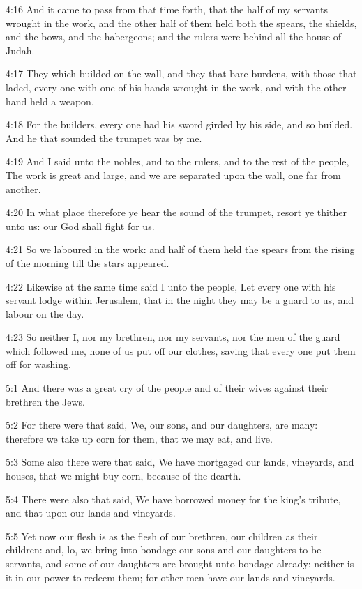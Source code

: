 4:16 And it came to pass from that time forth, that the half of my servants wrought in the work, and the other half of them held both the spears, the shields, and the bows, and the habergeons; and the rulers were behind all the house of Judah.

4:17 They which builded on the wall, and they that bare burdens, with those that laded, every one with one of his hands wrought in the work, and with the other hand held a weapon.

4:18 For the builders, every one had his sword girded by his side, and so builded. And he that sounded the trumpet was by me.

4:19 And I said unto the nobles, and to the rulers, and to the rest of the people, The work is great and large, and we are separated upon the wall, one far from another.

4:20 In what place therefore ye hear the sound of the trumpet, resort ye thither unto us: our God shall fight for us.

4:21 So we laboured in the work: and half of them held the spears from the rising of the morning till the stars appeared.

4:22 Likewise at the same time said I unto the people, Let every one with his servant lodge within Jerusalem, that in the night they may be a guard to us, and labour on the day.

4:23 So neither I, nor my brethren, nor my servants, nor the men of the guard which followed me, none of us put off our clothes, saving that every one put them off for washing.

5:1 And there was a great cry of the people and of their wives against their brethren the Jews.

5:2 For there were that said, We, our sons, and our daughters, are many: therefore we take up corn for them, that we may eat, and live.

5:3 Some also there were that said, We have mortgaged our lands, vineyards, and houses, that we might buy corn, because of the dearth.

5:4 There were also that said, We have borrowed money for the king's tribute, and that upon our lands and vineyards.

5:5 Yet now our flesh is as the flesh of our brethren, our children as their children: and, lo, we bring into bondage our sons and our daughters to be servants, and some of our daughters are brought unto bondage already: neither is it in our power to redeem them; for other men have our lands and vineyards.

